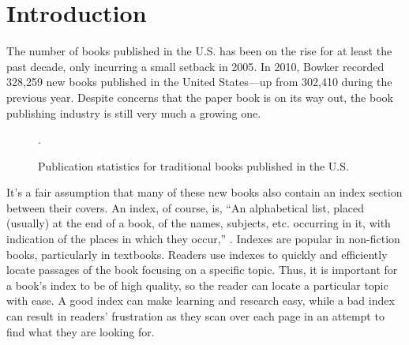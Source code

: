 \section{Introduction}

The number of books published in the U.S. has been on the rise for at least the past decade, only incurring a small setback in 2005\cite{bowker}.
In 2010, Bowker recorded 328,259 new books published in the United States---up from 302,410 during the previous year.
Despite concerns that the paper book is on its way out, the book publishing industry is still very much a growing one.

\begin{figure}
\begin{center}
\label{fig:new-books}
\caption{Publication statistics for traditional books published in the U.S.\cite{bowker}}.
\end{center}
\end{figure}

It's a fair assumption that many of these new books also contain an index section between their covers.
An index, of course, is, ``An alphabetical list, placed (usually) at the end of a book, of the names, subjects, etc. occurring in it, with indication of the places in which they occur,'' \cite{oed-index}.
Indexes are popular in non-fiction books, particularly in textbooks.
Readers use indexes to quickly and efficiently locate passages of the book focusing on a specific topic.
Thus, it is important for a book's index to be of high quality, so the reader can locate a particular topic with ease.
A good index can make learning and research easy, while a bad index can result in readers' frustration as they scan over each page in an attempt to find what they are looking for.

